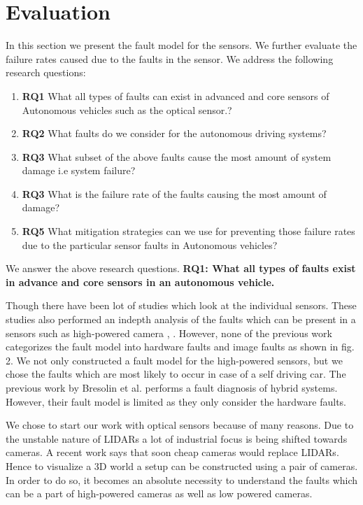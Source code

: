 \section{Evaluation}
In this section we present the fault model for the sensors. We further evaluate the failure rates caused due to the faults in the sensor. We address the following research questions:
\begin{enumerate}
	\item \textbf{RQ1}
	What all types of faults can exist in advanced and core sensors of Autonomous vehicles such as the optical sensor.?
	\item \textbf{RQ2}
	What faults do we consider for the autonomous driving systems?
	\item \textbf{RQ3}
	What subset of the above faults cause the most amount of system damage i.e system failure?
	\item \textbf{RQ3}
	What is the failure rate of the faults causing the most amount of damage?
	\item \textbf{RQ5}
	What mitigation strategies can we use for preventing those failure rates due to the particular sensor faults in Autonomous vehicles?
\end{enumerate}
\vskip 0.2in
We answer the above research questions. 
\vskip 0.2in
\textbf{RQ1: What all types of faults exist in advance and core sensors in an autonomous vehicle.}

Though there have been lot of studies which look at the individual sensors. These studies also performed an indepth analysis of the faults which can be present in a sensors such as high-powered camera \cite{5530865}, \cite{inproceedings}. However, none of the previous work categorizes the fault model into hardware faults and image faults as shown in fig. 2. We not only constructed a fault model for the high-powered sensors, but we chose the faults which are most likely to occur in case of a self driving car. The previous work by Bresolin et al. \cite{inproceedings} performs a fault diagnosis of hybrid systems. However, their fault model is limited as they only consider the hardware faults. 

We chose to start our work with optical sensors because of many reasons. Due to the unstable nature of LIDARs a lot of industrial focus is being shifted towards cameras. A recent work says that soon cheap cameras would replace LIDARs\cite{cheapcamera}. Hence to visualize a 3D world a setup can be constructed using a pair of cameras. In order to do so, it becomes an absolute necessity to understand the faults which can be a part of high-powered cameras as well as low powered cameras. 

